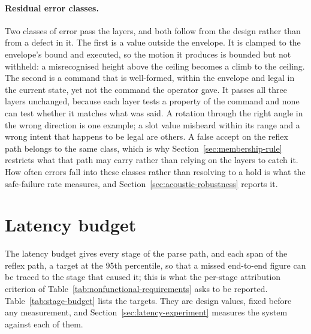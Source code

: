 \paragraph{Residual error classes.} Two classes of error pass the layers, and both follow
from the design rather than from a defect in it. The first is a value outside the envelope. It is
clamped to the envelope's bound and executed, so the motion it produces is bounded but not
withheld: a misrecognised height above the ceiling becomes a climb to the ceiling. The second is a
command that is well-formed, within the envelope and legal in the current state, yet not the
command the operator gave. It passes all three layers unchanged, because each layer tests a
property of the command and none can test whether it matches what was said. A rotation through the
right angle in the wrong direction is one example; a slot value misheard within its range and a
wrong intent that happens to be legal are others. A false accept on the reflex path belongs to the
same class, which is why Section~\ref{sec:membership-rule} restricts what that path may carry
rather than relying on the layers to catch it. How often errors fall into these classes rather
than resolving to a hold is what the safe-failure rate measures, and
Section~\ref{sec:acoustic-robustness} reports it.

\section{Latency budget}
\label{sec:latency-budget}
The latency budget gives every stage of the parse path, and each span of the reflex path, a target
at the 95th percentile, so that a
missed end-to-end figure can be traced to the stage that caused it; this is what the per-stage
attribution criterion of Table~\ref{tab:nonfunctional-requirements} asks to be reported.
Table~\ref{tab:stage-budget} lists the targets. They are design values, fixed before any
measurement, and Section~\ref{sec:latency-experiment} measures the system against each of them.

